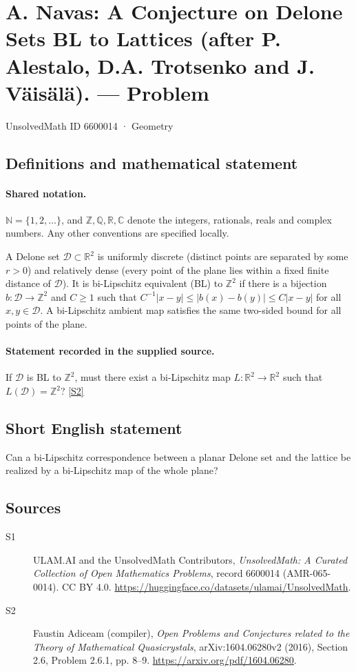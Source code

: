 \documentclass[11pt]{article}
\newcommand{\sref}[2]{\hyperlink{source:#1:#2}{[S#2]}}
\begin{document}
\setcounter{section}{6600013}
\section{A. Navas: A Conjecture on Delone Sets BL to Lattices (after P. Alestalo, D.A. Trotsenko and J. V\"ais\"al\"a). — Problem}\label{6600014}
{\small\sffamily UnsolvedMath ID 6600014 · Geometry}
\subsection{Definitions and mathematical statement}

\paragraph{Shared notation.}$\mathbb N=\{1,2,\ldots\}$, and $\mathbb Z,\mathbb Q,\mathbb R,\mathbb C$ denote the integers, rationals, reals and complex numbers. Any other conventions are specified locally.


A Delone set $\mathcal D\subset\mathbb R^2$ is uniformly discrete (distinct points are separated by some $r>0$) and relatively dense (every point of the plane lies within a fixed finite distance of $\mathcal D$). It is bi-Lipschitz equivalent (BL) to $\mathbb Z^2$ if there is a bijection $b:\mathcal D\to\mathbb Z^2$ and $C\geq1$ such that $C^{-1}|x-y|\leq|b(x)-b(y)|\leq C|x-y|$ for all $x,y\in\mathcal D$. A bi-Lipschitz ambient map satisfies the same two-sided bound for all points of the plane.
\paragraph{Statement recorded in the supplied source.}
If $\mathcal D$ is BL to $\mathbb Z^2$, must there exist a bi-Lipschitz map $L:\mathbb R^2\to\mathbb R^2$ such that $L(\mathcal D)=\mathbb Z^2$? \sref{6600014}{2}
\subsection{Short English statement}
Can a bi-Lipschitz correspondence between a planar Delone set and the lattice be realized by a bi-Lipschitz map of the whole plane?
\subsection{Sources}
\begin{description}
\item[\hypertarget{source:6600014:1}{S1}] ULAM.AI and the UnsolvedMath Contributors, \emph{UnsolvedMath: A Curated Collection of Open Mathematics Problems}, record 6600014 (AMR-065-0014). CC BY 4.0. \url{https://huggingface.co/datasets/ulamai/UnsolvedMath}.
\item[\hypertarget{source:6600014:2}{S2}] Faustin Adiceam (compiler), \emph{Open Problems and Conjectures related to the Theory of Mathematical Quasicrystals}, arXiv:1604.06280v2 (2016), Section 2.6, Problem 2.6.1, pp. 8--9. \url{https://arxiv.org/pdf/1604.06280}.
\end{description}
\label{end:6600014}
\end{document}
